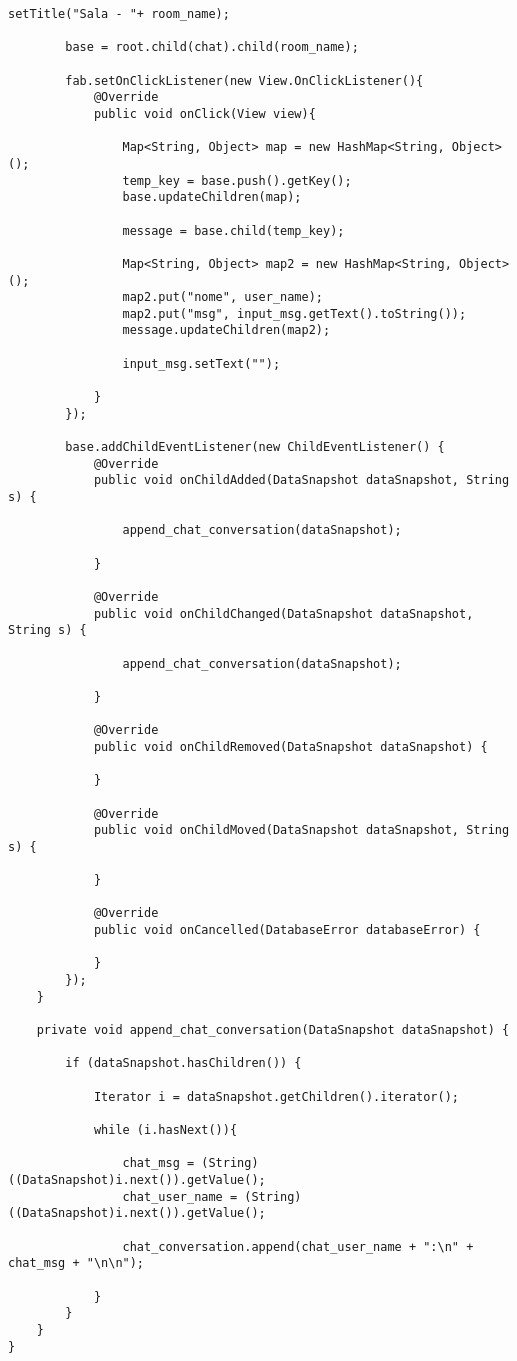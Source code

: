 \documentclass[12pt,a4paper]{article}
\begin{document}
\begin{lstlisting}[caption=./mobile/src/main/java/app/transparenciaeducativa/RoomChatRealTimeActivity.java]
        setTitle("Sala - "+ room_name);

        base = root.child(chat).child(room_name);

        fab.setOnClickListener(new View.OnClickListener(){
            @Override
            public void onClick(View view){

                Map<String, Object> map = new HashMap<String, Object>();
                temp_key = base.push().getKey();
                base.updateChildren(map);

                message = base.child(temp_key);

                Map<String, Object> map2 = new HashMap<String, Object>();
                map2.put("nome", user_name);
                map2.put("msg", input_msg.getText().toString());
                message.updateChildren(map2);

                input_msg.setText("");

            }
        });

        base.addChildEventListener(new ChildEventListener() {
            @Override
            public void onChildAdded(DataSnapshot dataSnapshot, String s) {

                append_chat_conversation(dataSnapshot);

            }

            @Override
            public void onChildChanged(DataSnapshot dataSnapshot, String s) {

                append_chat_conversation(dataSnapshot);

            }

            @Override
            public void onChildRemoved(DataSnapshot dataSnapshot) {

            }

            @Override
            public void onChildMoved(DataSnapshot dataSnapshot, String s) {

            }

            @Override
            public void onCancelled(DatabaseError databaseError) {

            }
        });
    }

    private void append_chat_conversation(DataSnapshot dataSnapshot) {

        if (dataSnapshot.hasChildren()) {

            Iterator i = dataSnapshot.getChildren().iterator();

            while (i.hasNext()){

                chat_msg = (String) ((DataSnapshot)i.next()).getValue();
                chat_user_name = (String) ((DataSnapshot)i.next()).getValue();

                chat_conversation.append(chat_user_name + ":\n" + chat_msg + "\n\n");

            }
        }
    }
}
\end{lstlisting}
\pagebreak
\end{document}
